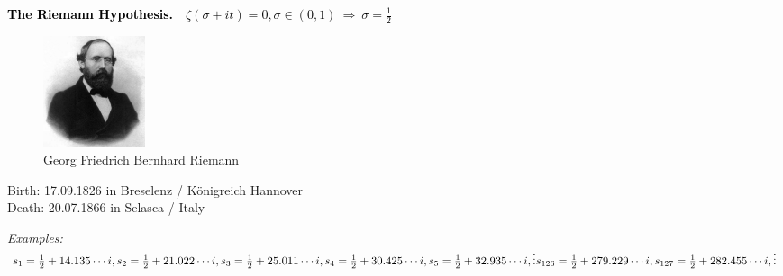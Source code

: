 \documentclass[landscape,display]{powersem} %
\newcommand{\heading}[1]{%
 \begin{center}
  \large\bf
  \shadowbox{{\textcolor{conceptcolor}{#1}}}%
 \end{center}
 \vspace{1ex minus 1ex}}
\begin{document}
\begin{slide}
\heading{Some conjectures about prime numbers: 5/5 }

\textcolor{black}{\textbf{The Riemann Hypothesis.}\ \ $\zeta(\sigma+it)=0, \sigma\in(0,1)\ \Rightarrow\ \sigma=\frac12$}\pause

\begin{figure}
 \hspace*{1cm}\includegraphics[width=3cm]{images/riemann.jpeg}\\
  {Georg Friedrich Bernhard Riemann}\end{figure}
\vspace*{-0.6cm}\begin{tiny}Birth: 17.09.1826 in Breselenz / K\"onigreich Hannover\\
\vspace*{-0.5cm}Death: 20.07.1866 in Selasca / Italy
\end{tiny}\pause

\vspace*{-4cm}\hspace*{7cm}
\begin{minipage}{6cm}
\textit{Examples:}\\ 
$s_1=\frac12+ 14.135\cdots i,\\ 
s_2=\frac12+21.022\cdots i,\\ 
s_3=\frac12+25.011\cdots i,\\
s_4=\frac12+30.425\cdots i,\\
s_5=\frac12+32.935\cdots i,\\
\vdots\\
s_{126}=\frac12+279.229\cdots i,\\
s_{127}=\frac12+282.455\cdots i,\\
\vdots$\end{minipage}
\end{slide}
\end{document}
